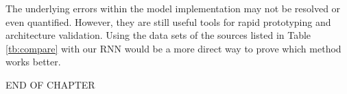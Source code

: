 The underlying errors within the model implementation may not be resolved or even quantified. However, they are still useful tools for rapid prototyping and architecture validation. Using the data sets of the sources listed in Table \ref{tb:compare} with our RNN would be a more direct way to prove which method works better.

\bigskip
\begin{center}
END OF CHAPTER
\end{center}